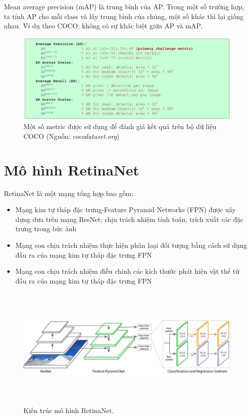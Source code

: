 \documentclass[a4paper, 12pt]{report}
\begin{document}
Mean average precision (mAP) là trung bình của AP. Trong một số trường hợp, ta tính AP cho mỗi class và lấy trung bình của chúng, một số khác thì lại giống nhau. Ví dụ theo COCO, không có sự khác biệt giữa AP và mAP.\par
\begin{figure}[!h]
	\centering
	\includegraphics[width=1\linewidth]{Images/cocometric}
	\caption{Một số metric được sử dụng để đánh giá kết quả trên bộ dữ liệu COCO (Nguồn: \textit{cocodataset.org})}
	\label{fig:cocometric}
\end{figure}

\section{Mô hình RetinaNet}
RetinaNet \cite{floss} là một mạng tổng hợp bao gồm:
\begin{itemize}
	\item Mạng kim tự tháp đặc trưng-Feature Pyramid Networks (FPN) được xây dựng dưa trên mạng ResNet; chịu trách nhiệm tính toán,  trích xuất các đặc trưng trong bức ảnh
	\item Mạng con chịu trách nhiệm thực hiện phân loại đối tượng bằng cách sử dụng đầu ra của mạng kim tự tháp đặc trưng FPN
	\item Mạng con chịu trách nhiệm điều chỉnh các kích thước phát hiện vật thể từ đầu ra của mạng kim tự tháp đặc trưng FPN
\end{itemize}
\begin{figure}[!h]
	\centering
	\includegraphics[width=12cm,height=6cm]{Images/resnet_visulize}
	\caption{Kiến trúc mô hình RetinaNet.}
	\label{fig:resnet-fpn4}
\end{figure}
\end{document}
